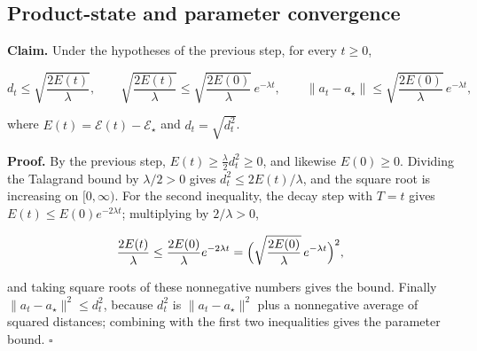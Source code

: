 \documentclass[11pt,a4paper]{report}
\begin{document}
\subsection{\texorpdfstring{Product-state and parameter convergence}{Product-state and parameter convergence}}


\textbf{Claim.} Under the hypotheses of the previous step, for every \(t\ge0\),


\[d_t\le\sqrt{\frac{2E(t)}\lambda},\qquad\sqrt{\frac{2E(t)}\lambda}\le\sqrt{\frac{2E(0)}\lambda}\,e^{-\lambda t},\qquad\|a_t-a_\star\|\le\sqrt{\frac{2E(0)}\lambda}\,e^{-\lambda t},\]


where \(E(t)=\mathcal E(t)-\mathcal E_\star\) and \(d_t=\sqrt{d_t^2}\).




\textbf{Proof.} By the previous step, \(E(t)\ge\frac\lambda2d_t^2\ge0\), and likewise \(E(0)\ge0\). Dividing the Talagrand bound by \(\lambda/2>0\) gives \(d_t^2\le2E(t)/\lambda\), and the square root is increasing on \([0,\infty)\). For the second inequality, the decay step with \(T=t\) gives \(E(t)\le E(0)e^{-2\lambda t}\); multiplying by \(2/\lambda>0\),


\[\frac{2E(t)}\lambda\le\frac{2E(0)}\lambda e^{-2\lambda t}=\Bigl(\sqrt{\frac{2E(0)}\lambda}\,e^{-\lambda t}\Bigr)^2,\]


and taking square roots of these nonnegative numbers gives the bound. Finally \(\|a_t-a_\star\|^2\le d_t^2\), because \(d_t^2\) is \(\|a_t-a_\star\|^2\) plus a nonnegative average of squared distances; combining with the first two inequalities gives the parameter bound. \(\square\)
\end{document}
